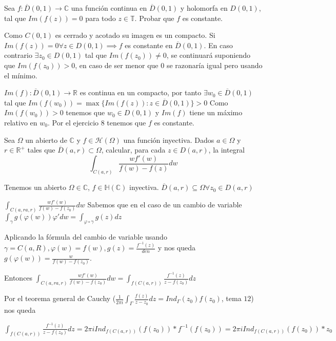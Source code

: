 \begin{ejer}
	Sea $f:\overline{D}(0,1)\rightarrow\mathbb{C}$ una función continua en $\overline{D}(0,1)$ y holomorfa en $D(0,1)$, tal que $Im(f(z)) = 0$ para todo $z\in\mathbb{T}$.
	Probar que $f$ es constante.
\end{ejer}
\begin{sol}
Como $C(0,1)$ es cerrado y acotado su imagen es un compacto.
Si $Im(f(z))=0 	\forall z\in D(0,1) \implies f$ es constante en $\overline{D}(0,1)$.
En caso contrario $\exists z_0 \in D(0,1)$ tal que $Im(f(z_0)) \not=0$, se continuará suponiendo que $Im(f(z_0))>0$, en caso de ser menor que $0$ se razonaría igual pero usando el mínimo.

$Im(f):\overline{D}(0,1)\rightarrow \mathbb{R}$ es continua en un compacto, por tanto $\exists w_0\in\overline{D}(0,1)$ tal que $Im(f(w_0)) = \max\{ Im(f(z)) : z\in\overline{D}(0,1) \} > 0$
Como $Im(f(w_0))>0$ tenemos que $w_0\in D(0,1)$ y $Im(f)$ tiene un máximo relativo en $w_0$.
Por el ejercicio $8$ tenemos que $f$ es constante.
\end{sol}


\begin{ejer}
	Sea $\Omega$ un abierto de $\mathbb{C}$ y $f\in\mathcal{H}(\Omega)$ una función inyectiva. 
	Dados $a\in\Omega$ y $r\in\mathbb{R}^+$ tales que $\overline{D}(a,r)\subset\Omega$, calcular, para cada $z\in D(a,r)$, la integral
	$$ \int_{C(a,r)} \frac{wf'(w)}{f(w)-f(z)} dw $$
\end{ejer}
\begin{sol}
Tenemos un abierto $\Omega\in\mathbb{C}$, $f\in\mathbb{H}(\mathbb{C})$ inyectiva.
$\overline{D}(a,r) \subseteq \Omega \forall z_0\in D(a,r)$

$\int_{C(a,ra,r)} \frac{wf'(w)}{f(w)-f(z_0)} dw$
Sabemos que en el caso de un cambio de variable
$\int_{\gamma}g(\varphi(w))\varphi' dw =\int_{\varphi \circ \gamma} g(z)dz $

Aplicando la fórmula del cambio de variable usando
$\gamma = C(a,R), \varphi(w) = f(w), g(z) = \frac{f^{-1}(z)}{den}$
y nos queda
$g(\varphi(w)) = \frac{w}{f(w)-f(z_0)}$.

Entonces
$\int_{C(a,ra,r)} \frac{wf'(w)}{f(w)-f(z_0)} dw = \int_{f(C(a,r))} \frac{f^{-1}(z)}{z-f(z_0)} dz$

Por el teorema general de Cauchy ($\frac{1}{2\pi i} \int_{\Gamma}\frac{f(z)}{z-z_0} dz = Ind_{\Gamma} (z_0)f(z_0)$, tema $12$) nos queda

$\int_{f(C(a,r))} \frac{f^{-1}(z)}{z-f(z_0)} dz = 2\pi i Ind_{f(C(a,r))} (f(z_0)) * f^{-1}(f(z_0)) = 2\pi i Ind_{f(C(a,r))} (f(z_0)) * z_0$ 
\end{sol}